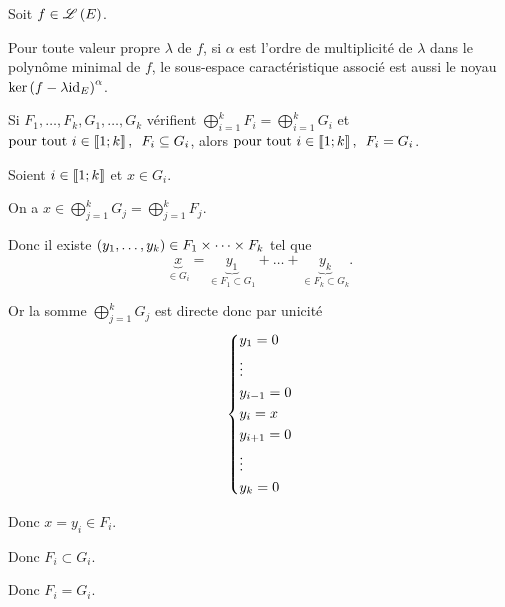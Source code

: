 \begin{prop}
Soit \(f\in\mathscr{L}\left(E\right)\).

Pour toute valeur propre \(\lambda\) de \(f\), si \(\alpha\) est l'ordre de multiplicité de \(\lambda\) dans le polynôme minimal de \(f\), le sous-espace caractéristique associé est aussi le noyau \(\ker\left(f-\lambda\mathrm{id}_{E}\right)^\alpha\).
\end{prop}

\begin{lem}
Si \(F_1,\dots,F_k,G_1,\dots,G_k\) vérifient \(\bigoplus_{i=1}^kF_i=\bigoplus_{i=1}^kG_i\) et \(\quantifs{\tpt i\in\interventierii{1}{k}}F_i\subset G_i\), alors \(\quantifs{\tpt i\in\interventierii{1}{k}}F_i=G_i\).
\end{lem}

\begin{dem}
Soient \(i\in\left\llbracket1;k\right\rrbracket\) et \(x\in G_i\).

On a \(x\in\bigoplus_{j=1}^kG_j=\bigoplus_{j=1}^kF_j\).

Donc il existe \(\left(y_1,\dots,y_k\right)\in F_1\times\dots\times F_k\) tel que \[\underbrace{x}_{\in G_i}=\underbrace{y_1}_{\in F_1\subset G_1}+\dots+\underbrace{y_k}_{\in F_k\subset G_k}.\]

Or la somme \(\bigoplus_{j=1}^kG_j\) est directe donc par unicité \[\begin{dcases}
y_1=0 \\
\vdots \\
y_{i-1}=0 \\
y_i=x \\
y_{i+1}=0 \\
\vdots \\
y_k=0
\end{dcases}\]

Donc \(x=y_i\in F_i\).

Donc \(F_i\subset G_i\).

Donc \(F_i=G_i\).
\end{dem}

